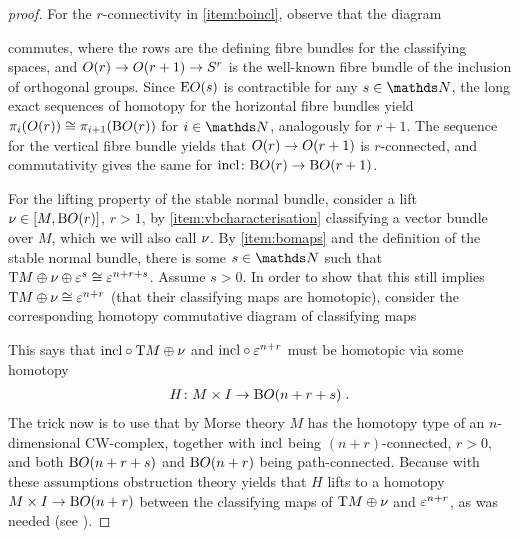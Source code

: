 \begin{Lem}
\begin{proof}[proof]
    For the $r$-connectivity in \ref{item:boincl}, observe that
    the diagram
    \begin{center}
    \end{center}
    commutes, where the rows are the defining fibre bundles for the
    classifying spaces, and $O(r)\to O(r+1)\to S^{r}$
    is the well-known fibre bundle of the inclusion of orthogonal groups.
    Since $\mathrm{E}O(s)$ is contractible for any $s\in\Nat$, 
    the long exact sequences of homotopy for the horizontal fibre bundles yield
    $\pi_i(O(r))\cong\pi_{i+1}(\mathrm{B}O(r))$ for $i\in\Nat$, analogously for $r+1$.
    The sequence for the vertical fibre bundle yields that
    $O(r)\to O(r+1)$ is $r$-connected, and commutativity gives
    the same for $\mathrm{incl}\colon\mathrm{B}O(r)\to\mathrm{B}O(r+1)$.
    
    For the lifting property of the stable normal bundle, consider a
    lift $\nu_{}\in[M,\mathrm{B}O(r)]$, $r>1$, by \ref{item:vbcharacterisation}
    classifying a vector bundle over $M$, which we will also call
    $\nu_{}$. By \ref{item:bomaps} and the definition
    of the stable normal bundle, there is some $s\in\Nat$
    such that $\mathrm{T}M\oplus\nu_{}\oplus\varepsilon^s\cong\varepsilon^{n+r+s}$.
    Assume $s>0$.
    In order to show that this still implies
    $\mathrm{T}M\oplus\nu_{}\cong\varepsilon^{n+r}$ (\idest that their
    classifying maps are homotopic), consider the corresponding
    homotopy commutative diagram of classifying maps
    \begin{center}
    \end{center}
    This says that $\mathrm{incl}\circ\mathrm{T}M\oplus\nu_{}$ and
    $\mathrm{incl}\circ\varepsilon^{n+r}$ must be homotopic via
    some homotopy
    \begin{gather*}
      H\colon M\times I\to\mathrm{B}O(n+r+s) \;.
    \end{gather*}
    The trick now is to use that by Morse theory $M$ has the homotopy
    type of an $n$-dimensional CW-complex, together with $\mathrm{incl}$ being
    $(n+r)$-connected, $r>0$, and both $\mathrm{B}O(n+r+s)$ and $\mathrm{B}O(n+r)$
    being path-connected. Because with these assumptions
    obstruction theory yields that
    $H$ lifts to a homotopy $M\times I\to\mathrm{B}O(n+r)$ between
    the classifying maps of $\mathrm{T}M\oplus\nu_{}$ and $\varepsilon^{n+r}$, as
    was needed
    (see \forexample \cite[Lemma~4.6]{hatcher}).
  \end{proof}
\end{Lem}
